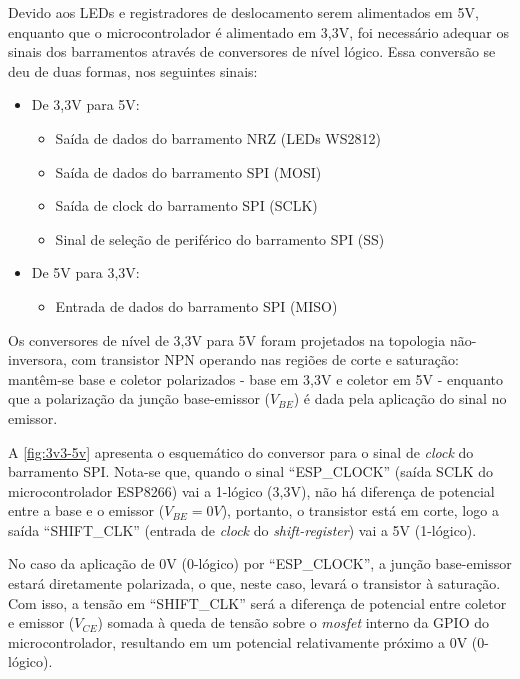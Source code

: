 Devido aos LEDs e registradores de deslocamento serem alimentados em 5V, enquanto que o microcontrolador é alimentado em 3,3V, foi necessário adequar os sinais dos barramentos através de conversores de nível lógico. Essa conversão se deu de duas formas, nos seguintes sinais:

\begin{itemize}
    \item De 3,3V para 5V:
        \begin{itemize}
            \item Saída de dados do barramento NRZ (LEDs WS2812)
            \item Saída de dados do barramento SPI (MOSI)
            \item Saída de clock do barramento SPI (SCLK)
            \item Sinal de seleção de periférico do barramento SPI (SS)
        \end{itemize}
    \item De 5V para 3,3V:
        \begin{itemize}
            \item Entrada de dados do barramento SPI (MISO)
        \end{itemize}
\end{itemize}

Os conversores de nível de 3,3V para 5V foram projetados na topologia não-inversora, com transistor NPN operando nas regiões de corte e saturação: mantêm-se base e coletor polarizados - base em 3,3V e coletor em 5V - enquanto que a polarização da junção base-emissor ($V_{BE}$) é dada pela aplicação do sinal no emissor.

A \autoref{fig:3v3-5v} apresenta o esquemático do conversor para o sinal de \emph{clock} do barramento SPI. Nota-se que, quando o sinal ``ESP\_CLOCK'' (saída SCLK do microcontrolador ESP8266) vai a 1-lógico (3,3V), não há diferença de potencial entre a base e o emissor ($V_{BE}=0V$), portanto, o transistor está em corte, logo a saída ``SHIFT\_CLK'' (entrada de \emph{clock} do \emph{shift-register}) vai a 5V (1-lógico).

No caso da aplicação de 0V (0-lógico) por ``ESP\_CLOCK'', a junção base-emissor estará diretamente polarizada, o que, neste caso, levará o transistor à saturação. Com isso, a tensão em ``SHIFT\_CLK'' será a diferença de potencial entre coletor e emissor ($V_{CE}$) somada à queda de tensão sobre o \emph{mosfet} interno da GPIO do microcontrolador, resultando em um potencial relativamente próximo a 0V (0-lógico).

